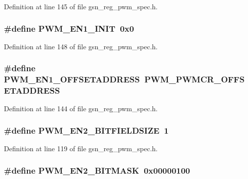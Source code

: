 Definition at line 145 of file gsn\_\-reg\_\-pwm\_\-spec.h.

\hypertarget{a00565_a34b74e0e84541202a25b69cba41e8066}{
\subsubsection[{PWM\_\-EN1\_\-INIT}]{\setlength{\rightskip}{0pt plus 5cm}\#define PWM\_\-EN1\_\-INIT~0x0}}
\label{a00565_a34b74e0e84541202a25b69cba41e8066}


Definition at line 148 of file gsn\_\-reg\_\-pwm\_\-spec.h.

\hypertarget{a00565_a7cdc9c922184aaf5dcc31f1894078157}{
\subsubsection[{PWM\_\-EN1\_\-OFFSETADDRESS}]{\setlength{\rightskip}{0pt plus 5cm}\#define PWM\_\-EN1\_\-OFFSETADDRESS~PWM\_\-PWMCR\_\-OFFSETADDRESS}}
\label{a00565_a7cdc9c922184aaf5dcc31f1894078157}


Definition at line 144 of file gsn\_\-reg\_\-pwm\_\-spec.h.

\hypertarget{a00565_ad291377138c0354336fceeb9ed5d4cb5}{
\subsubsection[{PWM\_\-EN2\_\-BITFIELDSIZE}]{\setlength{\rightskip}{0pt plus 5cm}\#define PWM\_\-EN2\_\-BITFIELDSIZE~1}}
\label{a00565_ad291377138c0354336fceeb9ed5d4cb5}


Definition at line 119 of file gsn\_\-reg\_\-pwm\_\-spec.h.

\hypertarget{a00565_a3d1cd2162acc720efb1a767901b921a0}{
\subsubsection[{PWM\_\-EN2\_\-BITMASK}]{\setlength{\rightskip}{0pt plus 5cm}\#define PWM\_\-EN2\_\-BITMASK~0x00000100}}
\label{a00565_a3d1cd2162acc720efb1a767901b921a0}


